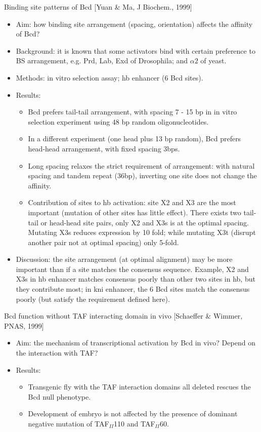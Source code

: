 \documentclass{report}
\begin{document}
Binding site patterns of Bcd [Yuan \& Ma, J Biochem., 1999]
\begin{itemize}
	\item Aim: how binding site arrangement (spacing, orientation) affects the affinity of Bcd? 
	
	\item Background: it is known that some activators bind with certain preference to BS arrangement, e.g. Prd, Lab, Exd of Drosophila; and $\alpha 2$ of yeast. 
	
	\item Methods: in vitro selection assay; hb enhancer (6 Bcd sites). 
	
	\item Results: 
	\begin{itemize}
		\item Bcd prefers tail-tail arrangement, with spacing 7 - 15 bp in in vitro selection experiment using 48 bp random oligonucleotides.  
		\item In a different experiment (one head plus 13 bp random), Bcd prefers head-head arrangement, with fixed spacing 3bps. 
		\item Long spacing relaxes the strict requirement of arrangement: with natural spacing and tandem repeat (36bp), inverting one site does not change the affinity. 
		\item Contribution of sites to hb activation: site X2 and X3 are the most important (mutation of other sites has little effect). There exists two tail-tail or head-head site pairs, only X2 and X3s is at the optimal spacing. Mutating X3s reduces expression by 10 fold; while mutating X3t (disrupt another pair not at optimal spacing) only 5-fold. 
	\end{itemize}
	
	\item Discussion: the site arrangement (at optimal alignment) may be more important than if a site matches the consensus sequence. Example, X2 and X3s in hb enhancer matches consensus poorly than other two sites in hb, but they contribute most; in kni enhancer, the 6 Bcd sites match the consensus poorly (but satisfy the requirement defined here). 
\end{itemize}

Bcd function without TAF interacting domain in vivo [Schaeffer \& Wimmer, PNAS, 1999]
\begin{itemize}
	\item Aim: the mechanism of transcriptional activation by Bcd in vivo? Depend on the interaction with TAF? 
	
	\item Results: 
	\begin{itemize}
		\item Transgenic fly with the TAF interaction domains all deleted rescues the Bcd null phenotype.
		\item Development of embryo is not affected by the presence of dominant negative mutation of TAF$_{II}$110 and TAF$_{II}$60. 
	\end{itemize}
\end{itemize}
\end{document}
